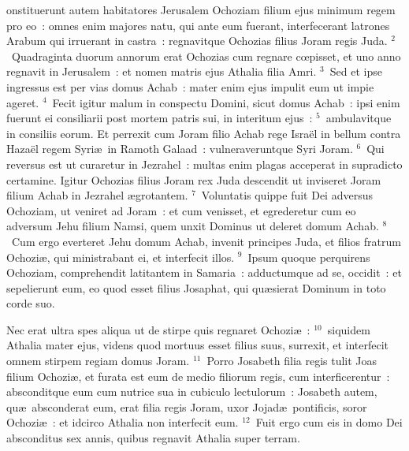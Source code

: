 \bchapter
{}onstituerunt autem habitatores Jerusalem Ochoziam filium ejus minimum regem pro eo~: omnes enim majores natu, qui ante eum fuerant, interfecerant latrones Arabum qui irruerant in castra~: regnavitque Ochozias filius Joram regis Juda.
${}^{2}$~Quadraginta duorum annorum erat Ochozias cum regnare cœpisset, et uno anno regnavit in Jerusalem~: et nomen matris ejus Athalia filia Amri.
${}^{3}$~Sed et ipse ingressus est per vias domus Achab~: mater enim ejus impulit eum ut impie ageret.
${}^{4}$~Fecit igitur malum in conspectu Domini, sicut domus Achab~: ipsi enim fuerunt ei consiliarii post mortem patris sui, in interitum ejus~:
${}^{5}$~ambulavitque in consiliis eorum. Et perrexit cum Joram filio Achab rege Isra\"el in bellum contra Haza\"el regem Syri\ae\ in Ramoth Galaad~: vulneraveruntque Syri Joram.
${}^{6}$~Qui reversus est ut curaretur in Jezrahel~: multas enim plagas acceperat in supradicto certamine. Igitur Ochozias filius Joram rex Juda descendit ut inviseret Joram filium Achab in Jezrahel \ae grotantem.
${}^{7}$~Voluntatis quippe fuit Dei adversus Ochoziam, ut veniret ad Joram~: et cum venisset, et egrederetur cum eo adversum Jehu filium Namsi, quem unxit Dominus ut deleret domum Achab.
${}^{8}$~Cum ergo everteret Jehu domum Achab, invenit principes Juda, et filios fratrum Ochozi\ae , qui ministrabant ei, et interfecit illos.
${}^{9}$~Ipsum quoque perquirens Ochoziam, comprehendit latitantem in Samaria~: adductumque ad se, occidit~: et sepelierunt eum, eo quod esset filius Josaphat, qui qu\ae sierat Dominum in toto corde suo.

 Nec erat ultra spes aliqua ut de stirpe quis regnaret Ochozi\ae~:
${}^{10}$~siquidem Athalia mater ejus, videns quod mortuus esset filius suus, surrexit, et interfecit omnem stirpem regiam domus Joram.
${}^{11}$~Porro Josabeth filia regis tulit Joas filium Ochozi\ae , et furata est eum de medio filiorum regis, cum interficerentur~: absconditque eum cum nutrice sua in cubiculo lectulorum~: Josabeth autem, qu\ae\ absconderat eum, erat filia regis Joram, uxor Jojad\ae\ pontificis, soror Ochozi\ae~: et idcirco Athalia non interfecit eum.
${}^{12}$~Fuit ergo cum eis in domo Dei absconditus sex annis, quibus regnavit Athalia super terram.

